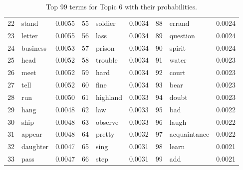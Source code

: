 \begin{table}[ht]
\begin{tabular}{rlrrlrrlr}
  22 & stand & 0.0055 & 55 & soldier & 0.0034 & 88 & errand & 0.0024 \\ 
  23 & letter & 0.0055 & 56 & lass & 0.0034 & 89 & question & 0.0024 \\ 
  24 & business & 0.0053 & 57 & prison & 0.0034 & 90 & spirit & 0.0024 \\ 
  25 & head & 0.0052 & 58 & trouble & 0.0034 & 91 & water & 0.0023 \\ 
  26 & meet & 0.0052 & 59 & hard & 0.0034 & 92 & court & 0.0023 \\ 
  27 & tell & 0.0052 & 60 & fine & 0.0034 & 93 & bear & 0.0023 \\ 
  28 & run & 0.0050 & 61 & highland & 0.0033 & 94 & doubt & 0.0023 \\ 
  29 & hang & 0.0048 & 62 & law & 0.0033 & 95 & bad & 0.0022 \\ 
  30 & ship & 0.0048 & 63 & observe & 0.0033 & 96 & laugh & 0.0022 \\ 
  31 & appear & 0.0048 & 64 & pretty & 0.0032 & 97 & acquaintance & 0.0022 \\ 
  32 & daughter & 0.0047 & 65 & sing & 0.0031 & 98 & learn & 0.0021 \\ 
  33 & pass & 0.0047 & 66 & step & 0.0031 & 99 & add & 0.0021 \\ 
   \hline
\end{tabular}
\caption{\small{ Top 99 terms for Topic 6 with their probabilities.}} 
\label{topic_6_terms}
\end{table}
